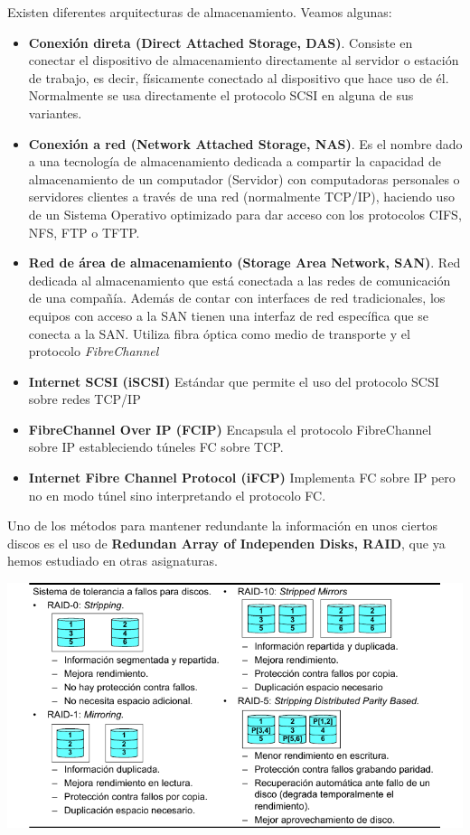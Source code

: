 Existen diferentes arquitecturas de almacenamiento. Veamos algunas:
\begin{itemize}
\item \textbf{Conexión direta (Direct Attached Storage, DAS)}. Consiste en conectar el dispositivo de almacenamiento directamente al servidor o estación de trabajo, es decir, físicamente conectado al dispositivo que hace uso de él. Normalmente se usa directamente el protocolo SCSI en alguna de sus variantes.

\item \textbf{Conexión a red (Network Attached Storage, NAS)}. Es el nombre dado a una tecnología de almacenamiento dedicada a compartir la capacidad de almacenamiento de un computador (Servidor) con computadoras personales o servidores clientes a través de una red (normalmente TCP/IP), haciendo uso de un Sistema Operativo optimizado para dar acceso con los protocolos CIFS, NFS, FTP o TFTP.

\item \textbf{Red de área de almacenamiento (Storage Area Network, SAN)}. Red dedicada al almacenamiento que está conectada a las redes de comunicación de una compañía. Además de contar con interfaces de red tradicionales, los equipos con acceso a la SAN tienen una interfaz de red específica que se conecta a la SAN. Utiliza fibra óptica como medio de transporte y el protocolo \textit{FibreChannel}

\item \textbf{Internet SCSI (iSCSI)} Estándar que permite el uso del protocolo SCSI sobre redes TCP/IP

\item \textbf{FibreChannel Over IP (FCIP)} Encapsula el protocolo FibreChannel sobre IP estableciendo túneles FC sobre TCP.

\item \textbf{Internet Fibre Channel Protocol (iFCP)} Implementa FC sobre IP pero no en modo túnel sino interpretando el protocolo FC.
\end{itemize}

Uno de los métodos para mantener redundante la información en unos ciertos discos es el uso de \textbf{Redundan Array of Independen Disks, RAID}, que ya hemos estudiado en otras asignaturas.

\begin{center}
\includegraphics[width=\linewidth]{img/raid.png}
\end{center}

